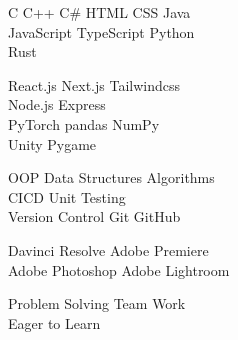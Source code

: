\documentclass[]{main}
\begin{document}
\begin{minipage}[t]{0.33\textwidth}
C \textbullet{}   C++ \textbullet{} C\# \textbullet{} HTML \textbullet{} CSS \textbullet{} Java \\
JavaScript \textbullet{} TypeScript \textbullet{} Python \\
Rust
\sectionsep

React.js \textbullet{} Next.js \textbullet{} Tailwindcss \\
Node.js \textbullet{} Express \\
PyTorch \textbullet{} pandas \textbullet{} NumPy \\
Unity \textbullet{} Pygame
\sectionsep

OOP \textbullet{} Data Structures \textbullet{} Algorithms \\ CI\/CD \textbullet{} Unit Testing 
 \\ Version Control \textbullet{} Git \textbullet{} GitHub
 
 \sectionsep
 
Davinci Resolve \textbullet{} Adobe Premiere
\\ Adobe Photoshop \textbullet{} Adobe Lightroom

\sectionsep

Problem Solving  \textbullet{} Team Work \\
Eager to Learn \\
\sectionsep

%
%

\end{minipage} 
\hfill
\end{document}
